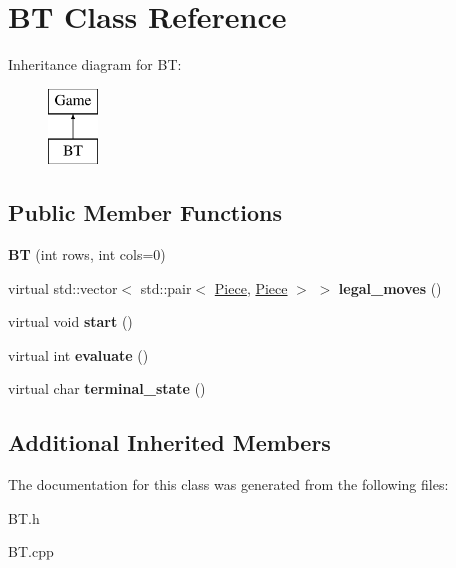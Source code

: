 \hypertarget{class_b_t}{}\section{BT Class Reference}
\label{class_b_t}
Inheritance diagram for BT\+:\begin{figure}[H]
\begin{center}
\leavevmode
\includegraphics[height=2.000000cm]{class_b_t}
\end{center}
\end{figure}
\subsection*{Public Member Functions}
\begin{DoxyCompactItemize}
\item 
\mbox{\label{class_b_t_ace122849e5dcf81df2748b44bec34f97}} 
{\bfseries BT} (int rows, int cols=0)
\item 
\mbox{\label{class_b_t_a4d3ad59ecb429b37c983986cc7802b17}} 
virtual std\+::vector$<$ std\+::pair$<$ \hyperlink{class_piece}{Piece}, \hyperlink{class_piece}{Piece} $>$ $>$ {\bfseries legal\+\_\+moves} ()
\item 
\mbox{\label{class_b_t_acb87d577e00a5fa66ddb653c697e3ad4}} 
virtual void {\bfseries start} ()
\item 
\mbox{\label{class_b_t_a330840afc9271716265fb65eb037d351}} 
virtual int {\bfseries evaluate} ()
\item 
\mbox{\label{class_b_t_a5b09c0eb2d583ae2141aeefe18545e5c}} 
virtual char {\bfseries terminal\+\_\+state} ()
\end{DoxyCompactItemize}
\subsection*{Additional Inherited Members}


The documentation for this class was generated from the following files\+:\begin{DoxyCompactItemize}
\item 
B\+T.\+h\item 
B\+T.\+cpp\end{DoxyCompactItemize}
